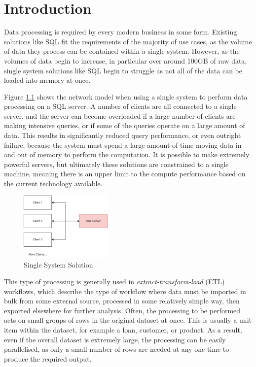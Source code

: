 \chapter{Introduction}\label{cha:intro}

Data processing is required by every modern business in some form. Existing solutions like SQL fit the requirements of the majority of use cases, as the volume of data they process can be contained within a single system. However, as the volumes of data begin to increase, in particular over around 100GB of raw data, single system solutions like SQL begin to struggle as not all of the data can be loaded into memory at once. 

Figure \ref{fig:single-system-solution} shows the network model when using a single system to perform data processing on a SQL server. A number of clients are all connected to a single server, and the server can become overloaded if a large number of clients are making intensive queries, or if some of the queries operate on a large amount of data. This results in significantly reduced query performance, or even outright failure, because the system must spend a large amount of time moving data in and out of memory to perform the computation. It is possible to make extremely powerful servers, but ultimately these solutions are constrained to a single machine, meaning there is an upper limit to the compute performance based on the current technology available.

\begin{figure}[h]
	\centering
	\includegraphics[width=0.4\textwidth]{chapters/diagrams/design/single-system-solution}
	\caption{Single System Solution}
	\label{fig:single-system-solution}
\end{figure}

This type of processing is generally used in \textit{extract-transform-load} (ETL) workflows, which describe the type of workflow where data must be imported in bulk from some external source, processed in some relatively simple way, then exported elsewhere for further analysis. Often, the processing to be performed acts on small groups of rows in the original dataset at once. This is usually a unit item within the dataset, for example a loan, customer, or product. As a result, even if the overall dataset is extremely large, the processing can be easily parallelised, as only a small number of rows are needed at any one time to produce the required output.

